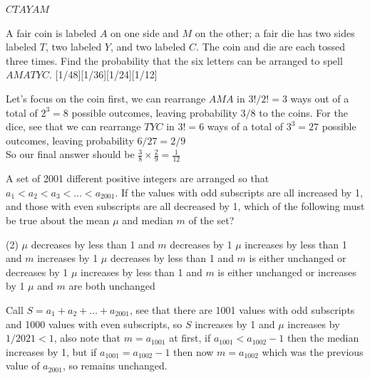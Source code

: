\documentclass[12pt]{article}
\newcounter{problem}
\begin{document}
\begin{solution}
      $CT\!AY\!\!AM$
\end{solution}

\begin{problem}
   A fair coin is labeled $A$ on one side and $M$ on the other; a fair die has two sides labeled $T$, two labeled $Y$, and two labeled $C$. The coin and die are each tossed three times. Find the probability that the six letters can be arranged to spell $AMATYC$. 
   [1/48][1/36][1/24][1/12]
\end{problem}

\begin{solution}[E]
   Let's focus on the coin first, we can rearrange $AMA$ in $3!/2!=3$ ways out of a total of $2^3=8$ possible outcomes, leaving probability $3/8$ to the coins. For the dice, see that we can rearrange $TYC$ in $3!=6$ ways of a total of $3^3=27$ possible outcomes, leaving probability $6/27=2/9$\\
    So our final answer should be $\frac{3}{8} \times \frac{2}{9} = \frac{1}{12}$
\end{solution}

\begin{problem}
   A set of 2001 different positive integers are arranged so that $a_1 < a_2 < a_3 < \dots < a_{2001}$. If the values with odd subscripts are all increased by 1, and those with even subscripts are all decreased by 1, which of the following must be true about the mean $\mu$ and median $m$ of the set?
    \begin{tasks}[label=\Alph*., label-width=13pt, before-skip=2mm, after-skip=0mm](2)
        \task $\mu$ decreases by less than 1 and $m$ decreases by 1
        \task $\mu$ increases by less than 1 and $m$ increases by 1
        \task $\mu$ decreases by less than 1 and $m$ is either unchanged or decreases by 1
        \task $\mu$ increases by less than 1 and $m$ is either unchanged or increases by 1
        \task $\mu$ and $m$ are both unchanged
    \end{tasks} 
\end{problem}

\begin{solution}[D]
   Call $S=a_1+a_2+\ldots+a_{2001}$, see that there are 1001 values with odd subscripts and 1000 values with even subscripts, so $S$ increases by 1 and $\mu$ increases by $1/2021<1$, also note that $m=a_{1001}$ at first, if $a_{1001}<a_{1002}-1$ then the median increases by 1, but if $a_{1001}=a_{1002}-1$ then now $m=a_{1002}$ which was the previous value of $a_{2001}$, so remains unchanged.
\end{solution}
\end{document}
